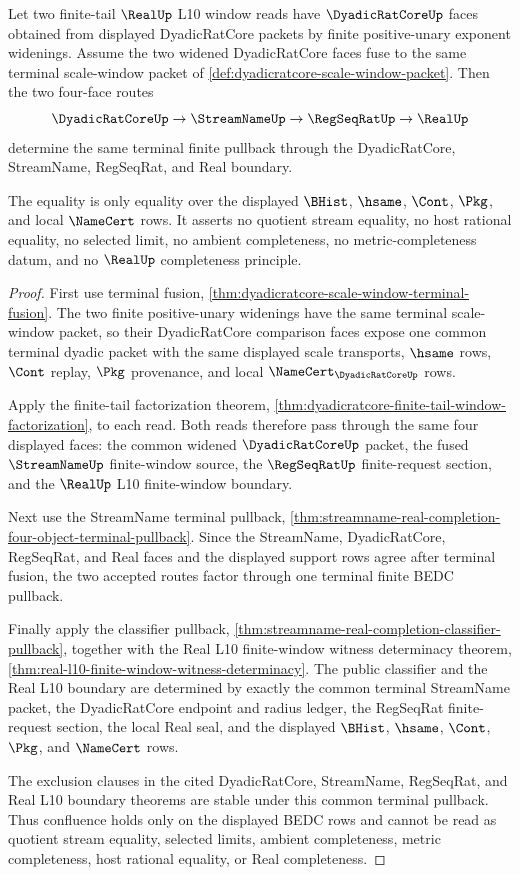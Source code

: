 \begin{theorem}
\label{thm:dyadicratcore-finite-tail-window-confluence}
Let two finite-tail $\RealUp$ L10 window reads have $\DyadicRatCoreUp$ faces obtained from displayed DyadicRatCore packets by finite positive-unary exponent widenings. Assume the two widened DyadicRatCore faces fuse to the same terminal scale-window packet of \autoref{def:dyadicratcore-scale-window-packet}. Then the two four-face routes
$$
\DyadicRatCoreUp \to \StreamNameUp \to \RegSeqRatUp \to \RealUp
$$
determine the same terminal finite pullback through the DyadicRatCore, StreamName, RegSeqRat, and Real boundary.

The equality is only equality over the displayed $\BHist$, $\hsame$, $\Cont$, $\Pkg$, and local $\NameCert$ rows. It asserts no quotient stream equality, no host rational equality, no selected limit, no ambient completeness, no metric-completeness datum, and no $\RealUp$ completeness principle.
\end{theorem}
\begin{proof}
First use terminal fusion, \autoref{thm:dyadicratcore-scale-window-terminal-fusion}. The two finite positive-unary widenings have the same terminal scale-window packet, so their DyadicRatCore comparison faces expose one common terminal dyadic packet with the same displayed scale transports, $\hsame$ rows, $\Cont$ replay, $\Pkg$ provenance, and local $\NameCert_{\DyadicRatCoreUp}$ rows.

Apply the finite-tail factorization theorem, \autoref{thm:dyadicratcore-finite-tail-window-factorization}, to each read. Both reads therefore pass through the same four displayed faces: the common widened $\DyadicRatCoreUp$ packet, the fused $\StreamNameUp$ finite-window source, the $\RegSeqRatUp$ finite-request section, and the $\RealUp$ L10 finite-window boundary.

Next use the StreamName terminal pullback, \autoref{thm:streamname-real-completion-four-object-terminal-pullback}. Since the StreamName, DyadicRatCore, RegSeqRat, and Real faces and the displayed support rows agree after terminal fusion, the two accepted routes factor through one terminal finite BEDC pullback.

Finally apply the classifier pullback, \autoref{thm:streamname-real-completion-classifier-pullback}, together with the Real L10 finite-window witness determinacy theorem, \autoref{thm:real-l10-finite-window-witness-determinacy}. The public classifier and the Real L10 boundary are determined by exactly the common terminal StreamName packet, the DyadicRatCore endpoint and radius ledger, the RegSeqRat finite-request section, the local Real seal, and the displayed $\BHist$, $\hsame$, $\Cont$, $\Pkg$, and $\NameCert$ rows.

The exclusion clauses in the cited DyadicRatCore, StreamName, RegSeqRat, and Real L10 boundary theorems are stable under this common terminal pullback. Thus confluence holds only on the displayed BEDC rows and cannot be read as quotient stream equality, selected limits, ambient completeness, metric completeness, host rational equality, or Real completeness.
\end{proof}


